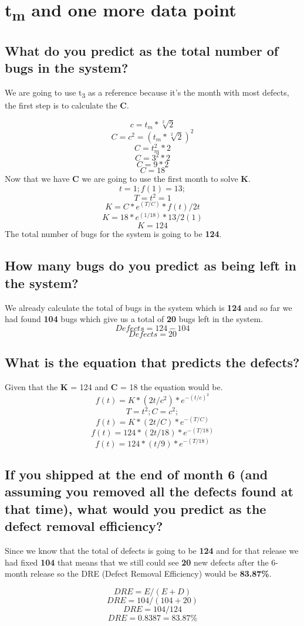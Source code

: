 \section{t\textsubscript{m} and one more data point}
\subsection{What do you predict as the total number of bugs in the system?}

We are going to use t\textsubscript{3} as a reference because it's the month with most defects, the first step is to calculate the \textbf{C}.

\[ c = t_m * \sqrt[2]{2}\]
\[ C = c ^2  = (t_m * \sqrt[2]{2})^2 \]
\[ C = t_m^2 * 2\]
\[ C = 3^2 * 2\]
\[ C = 9 * 2\]
\[ C = 18\]
\noindent
Now that we have \textbf{C} we are going to use the first month to solve \textbf{K}.
\[ t = 1; f(1) = 13;\]
\[ T = t^2 = 1\]
\[ K = C * e^{(T/C)} * f(t)/2t\]
\[ K = 18 * e^{(1/18)} * 13/2(1)\]
\[ K = 124\]
\noindent
The total number of bugs for the system is going to be \textbf{124}.

\pagebreak

\subsection{How many bugs do you predict as being left in the system? }
We already calculate the total of bugs in the system which is \textbf{124} and so far we had found \textbf{104} bugs which give us a total of \textbf{20} bugs left in the system. 
\[ Defects = 124 - 104\]
\[ Defects = 20\]

\subsection{What is the equation that predicts the defects? }
Given that the \textbf{K} = 124 and \textbf{C} = 18 the equation would be.
\[ f(t) = K * (2t / c^2) * e^{-(t/c)^2}\]
\[ T = t^2; C = c^2;\]
\[ f(t) = K * (2t / C) * e^{-(T/C)}\]
\[ f(t) = 124 * (2t / 18) * e^{-(T/18)}\]
\[ f(t) = 124 * (t / 9) * e^{-(T/18)}\]
\subsection{If you shipped at the end of month 6 (and assuming you removed all the defects found at that time), what would you predict as the defect removal efficiency?}
Since we know that the total of defects is going to be \textbf{124} and for that release we had fixed \textbf{104} that means that we still could see \textbf{20} new defects after the 6-month release so the DRE (Defect Removal Efficiency) would be \textbf{83.87\%}.

\[ DRE = E / (E + D)\]
\[ DRE = 104 / (104 + 20) \]
\[ DRE = 104 / 124 \]
\[ DRE = 0.8387 = 83.87\%\]